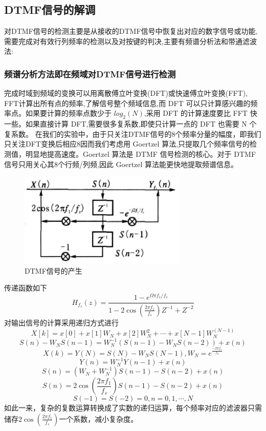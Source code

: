 \documentclass{article}
\begin{document}
\begin{CJK}{UTF8}{gbsn}
\subsection{DTMF信号的解调}
对DTMF信号的检测主要是从接收的DTMF信号中恢复出对应的数字信号或功能,需要完成对有效行列频率的检测以及对按键的判决,主要有频谱分析法和带通滤波法:
\subsubsection{频谱分析方法即在频域对DTMF信号进行检测}
完成时域到频域的变换可以用离散傅立叶变换(DFT)或快速傅立叶变换(FFT), FFT计算出所有点的频率,了解信号整个频域信息,而 DFT 可以只计算感兴趣的频率点。如果要计算的频率点数少于 $log_2( N )$,采用 DFT 的计算速度要比 FFT 快一些。如果直接计算 DFT,需要很多复系数,即使只计算一点的 DFT 也需要 N 个复系数。
在我们的实验中，由于只关注DTMF信号的$8$个频率分量的幅度，即我们只关注DFT变换后相应$8$因而我们考虑用 Goertzel 算法,只提取几个频率信号的检测值，明显地提高速度。Goertzel 算法是 DTMF 信号检测的核心。对于 DTMF 信号只用关心其$8$个行频/列频,因此 Goertzel 算法能更快地提取频谱信息。
	\begin{figure}[h!]
	\centering
	\includegraphics[width=8cm]{G.png}
	\caption{DTMF信号的产生}
	\end{figure}
传递函数如下
	\[H_{f_s}(z)=\frac{1-e^{\Omega\pi f_1/f_s}}{1-2\cos\left(\frac{2\pi f_1}{f_s}\right)Z^{-1}+Z^{-2}}\]
对输出信号的计算采用递归方式进行
\[X\left[k\right]=x\left[0\right]+x\left[1\right]W_N+x\left[2\right]W_N^2+\cdots+x\left[N-1\right]W_N^{(N-1)}\]
\[S(n)-W_NS(n-1)=W_N^{-1}\left(S(n-1)-W_NS(n-2)\right)+x(n)\]
\[X(k)=Y(N)=S(N)-W_NS(N-1),W_N=e^{\frac{-2\pi f_1}{f_2}}\]
\[Y(n)=W_N^{-1}Y(n-1)+x(n)\]
\[S(n)=\left(W_N+W_N^{-1}\right)S(n-1)-S(n-2)+x(n)\]
\[S(n)=2\cos\left(\frac{2\pi f_1}{f_s}\right)S(n-1)-S(n-2)+x(n)\]
\[S(-1)=S(-2)=0, n=0,1,\cdots,N\]
如此一来，复杂的复数运算转换成了实数的递归运算，每个频率对应的滤波器只需储存$2\cos\left(\frac{2\pi f_1}{f_s}\right)$一个系数，减小复杂度。

\end{CJK}
\end{document}
